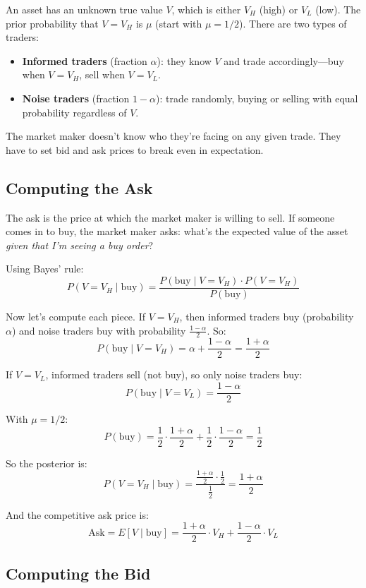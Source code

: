 \documentclass[11pt]{article}
\begin{document}
An asset has an unknown true value $V$, which is either $V_H$ (high) or $V_L$ (low). The prior probability that $V = V_H$ is $\mu$ (start with $\mu = 1/2$). There are two types of traders:
\begin{itemize}
\item \textbf{Informed traders} (fraction $\alpha$): they know $V$ and trade accordingly---buy when $V = V_H$, sell when $V = V_L$.
\item \textbf{Noise traders} (fraction $1 - \alpha$): trade randomly, buying or selling with equal probability regardless of $V$.
\end{itemize}

The market maker doesn't know who they're facing on any given trade. They have to set bid and ask prices to break even in expectation.

\subsection{Computing the Ask}

The ask is the price at which the market maker is willing to sell. If someone comes in to buy, the market maker asks: what's the expected value of the asset \emph{given that I'm seeing a buy order}?

Using Bayes' rule:
\[
P(V = V_H \mid \text{buy}) = \frac{P(\text{buy} \mid V = V_H) \cdot P(V = V_H)}{P(\text{buy})}
\]

Now let's compute each piece. If $V = V_H$, then informed traders buy (probability $\alpha$) and noise traders buy with probability $\frac{1-\alpha}{2}$. So:
\[
P(\text{buy} \mid V = V_H) = \alpha + \frac{1-\alpha}{2} = \frac{1+\alpha}{2}
\]

If $V = V_L$, informed traders sell (not buy), so only noise traders buy:
\[
P(\text{buy} \mid V = V_L) = \frac{1-\alpha}{2}
\]

With $\mu = 1/2$:
\[
P(\text{buy}) = \frac{1}{2} \cdot \frac{1+\alpha}{2} + \frac{1}{2} \cdot \frac{1-\alpha}{2} = \frac{1}{2}
\]

So the posterior is:
\[
P(V = V_H \mid \text{buy}) = \frac{\frac{1+\alpha}{2} \cdot \frac{1}{2}}{\frac{1}{2}} = \frac{1+\alpha}{2}
\]

And the competitive ask price is:
\[
\text{Ask} = E[V \mid \text{buy}] = \frac{1+\alpha}{2} \cdot V_H + \frac{1-\alpha}{2} \cdot V_L
\]

\subsection{Computing the Bid}
\end{document}
